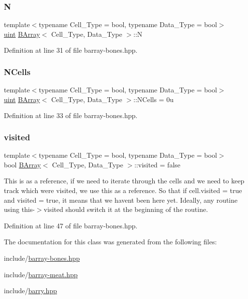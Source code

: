 \subsubsection{\texorpdfstring{N}{N}}
{\footnotesize\ttfamily template$<$typename Cell\+\_\+\+Type = bool, typename Data\+\_\+\+Type = bool$>$ \\
\hyperlink{typedefs_8hpp_a91ad9478d81a7aaf2593e8d9c3d06a14}{uint} \hyperlink{class_b_array}{B\+Array}$<$ Cell\+\_\+\+Type, Data\+\_\+\+Type $>$\+::N}



Definition at line 31 of file barray-\/bones.\+hpp.

\mbox{\label{class_b_array_a31fd64c6b54408ca98e07abc9c4241c5}} 
\subsubsection{\texorpdfstring{N\+Cells}{NCells}}
{\footnotesize\ttfamily template$<$typename Cell\+\_\+\+Type = bool, typename Data\+\_\+\+Type = bool$>$ \\
\hyperlink{typedefs_8hpp_a91ad9478d81a7aaf2593e8d9c3d06a14}{uint} \hyperlink{class_b_array}{B\+Array}$<$ Cell\+\_\+\+Type, Data\+\_\+\+Type $>$\+::N\+Cells = 0u}



Definition at line 33 of file barray-\/bones.\+hpp.

\mbox{\label{class_b_array_ae0860bf21425397d1498f94da6518e85}} 
\subsubsection{\texorpdfstring{visited}{visited}}
{\footnotesize\ttfamily template$<$typename Cell\+\_\+\+Type = bool, typename Data\+\_\+\+Type = bool$>$ \\
bool \hyperlink{class_b_array}{B\+Array}$<$ Cell\+\_\+\+Type, Data\+\_\+\+Type $>$\+::visited = false}

This is as a reference, if we need to iterate through the cells and we need to keep track which were visited, we use this as a reference. So that if cell.\+visited = true and visited = true, it means that we haven\textquotesingle{}t been here yet. Ideally, any routine using this-\/$>$visited should switch it at the beginning of the routine. 

Definition at line 47 of file barray-\/bones.\+hpp.



The documentation for this class was generated from the following files\+:\begin{DoxyCompactItemize}
\item 
include/\hyperlink{barray-bones_8hpp}{barray-\/bones.\+hpp}\item 
include/\hyperlink{barray-meat_8hpp}{barray-\/meat.\+hpp}\item 
include/\hyperlink{barry_8hpp}{barry.\+hpp}\end{DoxyCompactItemize}
